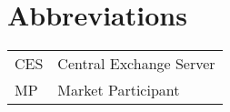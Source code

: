 \chapter{Abbreviations}
\begin{table}[h]
\begin{tabular}{ll}
CES & Central Exchange Server \label{abbr:CES}\\
MP & Market Participant \label{abbr:MP}\\
\end{tabular}
\end{table}


